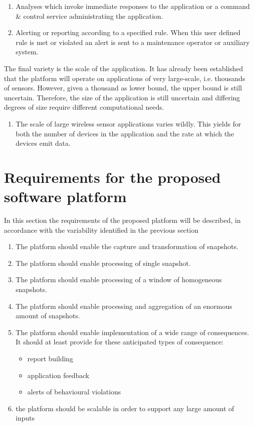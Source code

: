 \begin{enumerate}[label=V\archid .\arabic*]
\begin{enumerate}
\item Analyses which invoke immediate responses to the application or a command \& control service administrating the application.
\item Alerting or reporting according to a specified rule. When this user defined rule is met or violated an alert is sent to a maintenance operator or auxiliary system.
\end{enumerate}
\end{enumerate}
The final variety is the scale of the application. It has already been established that the platform will operate on applications of very large-scale, i.e. thousands of sensors. However, given a thousand as lower bound, the upper bound is still uncertain. Therefore, the size of the application is still uncertain and differing degrees of size require different computational needs.
\begin{enumerate}[label=V\archid .\arabic* , resume]
\nospace
\item \label{v:scale} The scale of large wireless sensor applications varies wildly. This yields for both the number of devices in the application and the rate at which the devices emit data.
\end{enumerate}
\section{Requirements for the proposed software platform}
In this section the requirements of the proposed platform will be described, in accordance with the variability identified in the previous section
\begin{enumerate}[label=R\archid .\arabic*]
\nospace
\item \label{r:snaptshot_transformation} The platform should enable the capture and transformation of snapshots.
\item \label{r:basis_single} The platform should enable processing of single snapshot.
\item \label{r:basis_historic} The platform should enable processing of a window of homogeneous snapshots.
\item \label{r:basis_accumulated} The platform should enable processing and aggregation of an enormous amount of snapshots.
\item \label{r:consequence} The platform should enable implementation of a wide range of consequences. It should at least provide for these anticipated types of consequence:
\begin{itemize}
\nospace
\item report building
\item application feedback
\item alerts of behavioural violations
\end{itemize}
\item \label{r:scale} the platform should be scalable in order to support any large amount of inputs
\end{enumerate}

